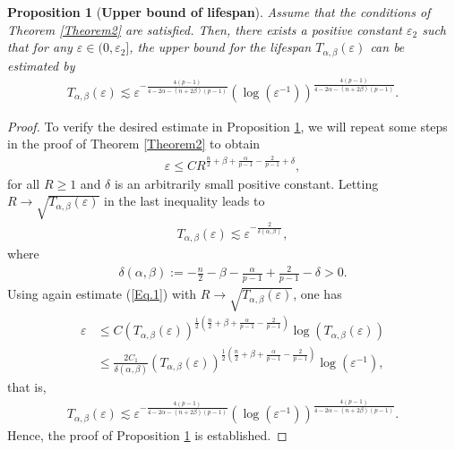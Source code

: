 \documentclass[11pt,reqno]{amsart}
\newtheorem{proposition}{Proposition}[section]
\begin{document}
\begin{proposition}[\textbf{Upper bound of lifespan}]\label{upper-bound}
  Assume that the conditions of Theorem \ref{Theorem2} are satisfied. Then, there exists a positive constant $\varepsilon_2$ such that for any $\varepsilon \in (0, \varepsilon_2]$, the upper bound for the lifespan $T_{\alpha, \beta}(\varepsilon)$ can be estimated by
  \begin{align}\label{Es.Pro3.2}
      T_{\alpha, \beta}(\varepsilon) \lesssim \varepsilon^{-\frac{4(p-1)}{4-2\alpha-(n+2\beta)(p-1)}} (\log(\varepsilon^{-1}))^{\frac{4(p-1)}{4-2\alpha-(n+2\beta)(p-1)}}.
   \end{align}
   \end{proposition}
   \begin{proof}
     To verify the desired estimate in Proposition \ref{upper-bound}, we will repeat some steps in the proof of Theorem \ref{Theorem2} to obtain
       \begin{align*}
           \varepsilon \leq C R^{\frac{n}{2}+\beta+\frac{\alpha}{p-1} -\frac{2}{p-1} +\delta},
       \end{align*}
       for all $R \geq 1$ and $\delta$ is an arbitrarily small positive constant. Letting $R \to \sqrt{T_{\alpha, \beta}(\varepsilon)}$ in the last inequality leads to
       \begin{align*}
           T_{\alpha, \beta}(\varepsilon) \lesssim \varepsilon^{-\frac{2}{\delta(\alpha, \beta)}},
       \end{align*}
       where 
       \begin{align*}
           \delta(\alpha, \beta) := -\frac{n}{2}-\beta -\frac{\alpha}{p-1}+\frac{2}{p-1}-\delta > 0.
       \end{align*}
       Using again estimate (\ref{Eq.1}) with $R \to \sqrt{T_{\alpha, \beta}(\varepsilon)}$, one has
       \begin{align*}
           \varepsilon &\leq C (T_{\alpha, \beta}(\varepsilon))^{\frac{1}{2}(\frac{n}{2}+\beta+\frac{\alpha}{p-1}-\frac{2}{p-1})} \log(T_{\alpha, \beta}(\varepsilon)) \\
           &\leq \frac{2C_1}{\delta(\alpha, \beta)}(T_{\alpha, \beta}(\varepsilon))^{\frac{1}{2}(\frac{n}{2}+\beta+\frac{\alpha}{p-1}-\frac{2}{p-1})} \log(\varepsilon^{-1}),
       \end{align*}
       that is,
       \begin{align*}
           T_{\alpha, \beta}(\varepsilon) \lesssim \varepsilon^{-\frac{4(p-1)}{4-2\alpha-(n+2\beta)(p-1)}} (\log(\varepsilon^{-1}))^{\frac{4(p-1)}{4-2\alpha-(n+2\beta)(p-1)}}.
       \end{align*}
       Hence, the proof of Proposition \ref{upper-bound} is established.
   \end{proof}
\end{document}
